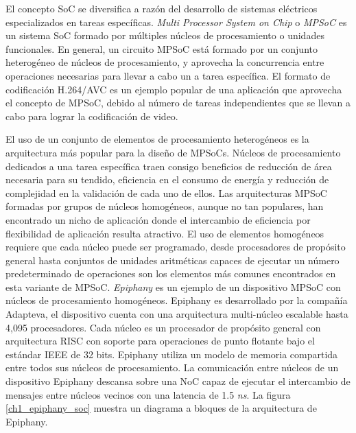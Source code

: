 El concepto SoC se diversifica a razón del desarrollo de sistemas eléctricos especializados en tareas específicas. \textit{Multi Processor System on Chip} o \textit{MPSoC}\cite{chapter1:kempf:2011:multiprocessor} es un sistema SoC formado por múltiples núcleos de procesamiento o unidades funcionales. En general, un circuito MPSoC está formado por un conjunto heterogéneo de núcleos de procesamiento, y aprovecha la concurrencia entre operaciones necesarias para llevar a cabo un a tarea específica. El formato de codificación H.264/AVC\cite{chapter1:1218189} es un ejemplo popular de una aplicación que aprovecha el concepto de MPSoC, debido al número de tareas independientes que se llevan a cabo para lograr la codificación de video.

El uso de un conjunto de elementos de procesamiento heterogéneos es la arquitectura más popular para la diseño de MPSoCs. Núcleos de procesamiento dedicados a una tarea específica traen consigo beneficios de reducción de área necesaria para su tendido, eficiencia en el consumo de energía y reducción de complejidad en la validación de cada uno de ellos. Las arquitecturas MPSoC formadas por grupos de núcleos homogéneos, aunque no tan populares, han encontrado un nicho de aplicación donde el intercambio de eficiencia por flexibilidad de aplicación resulta atractivo. El uso de elementos homogéneos requiere que cada núcleo puede ser programado, desde procesadores de propósito general hasta conjuntos de unidades aritméticas capaces de ejecutar un número predeterminado de operaciones son los elementos más comunes encontrados en esta variante de MPSoC. \textit{Epiphany} es un ejemplo de un dispositivo MPSoC con núcleos de procesamiento homogéneos. Epiphany es desarrollado por la compañía Adapteva\cite{chapter1:ADAPTEVA:HOME}, el dispositivo cuenta con una arquitectura multi-núcleo escalable hasta 4,095 procesadores. Cada núcleo es un procesador de propósito general con arquitectura RISC con soporte para operaciones de punto flotante bajo el estándar IEEE de 32 bits. Epiphany utiliza un modelo de memoria compartida entre todos sus núcleos de procesamiento. La comunicación entre núcleos de un dispositivo Epiphany descansa sobre una NoC capaz de ejecutar el intercambio de mensajes entre núcleos vecinos con una latencia de 1.5 \textit{ns}. La figura \ref{ch1_epiphany_soc} muestra un diagrama a bloques de la arquitectura de Epiphany.

